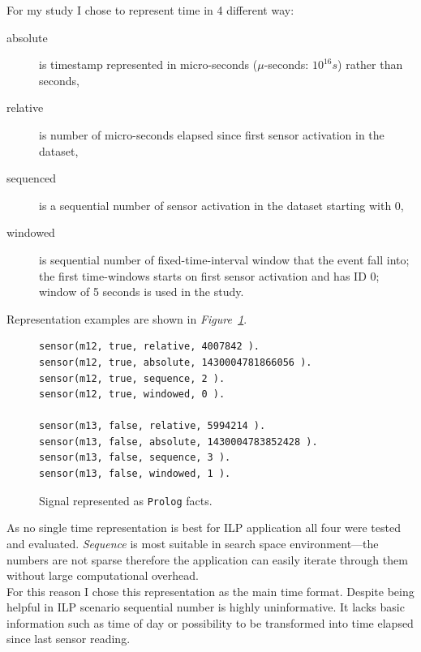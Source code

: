 \documentclass[12pt, a4paper, pdflatex, leqno, twoside, openright]{report}
\begin{document}
For my study I chose to represent time in 4 different way:
\begin{description}
\item[absolute] is timestamp represented in micro-seconds ($\mu$-seconds: $10^{16}s$) rather than seconds,
\item[relative] is number of micro-seconds elapsed since first sensor activation in the dataset,
\item[sequenced] is a sequential number of sensor activation in the dataset starting with $0$,
\item[windowed] is sequential number of fixed-time-interval window that the event fall into; the first time-windows starts on first sensor activation and has ID $0$; window of 5 seconds is used in the study.
\end{description}
Representation examples are shown in \emph{Figure~\ref{lst:timerepresentation}}.\\

\begin{figure}[htb] %
  \begin{verbatim}
sensor(m12, true, relative, 4007842 ).
sensor(m12, true, absolute, 1430004781866056 ).
sensor(m12, true, sequence, 2 ).
sensor(m12, true, windowed, 0 ).

sensor(m13, false, relative, 5994214 ).
sensor(m13, false, absolute, 1430004783852428 ).
sensor(m13, false, sequence, 3 ).
sensor(m13, false, windowed, 1 ).
  \end{verbatim}
  \caption{Signal represented as \texttt{Prolog} facts.\label{lst:timerepresentation}}
\end{figure}

As no single time representation is best for ILP application all four were tested and evaluated. \emph{Sequence} is most suitable in search space environment---the numbers are not sparse therefore the application can easily iterate through them without large computational overhead.\\
For this reason I chose this representation as the main time format. Despite being helpful in ILP scenario sequential number is highly uninformative. It lacks basic information such as time of day or possibility to be transformed into time elapsed since last sensor reading.\\
\end{document}
